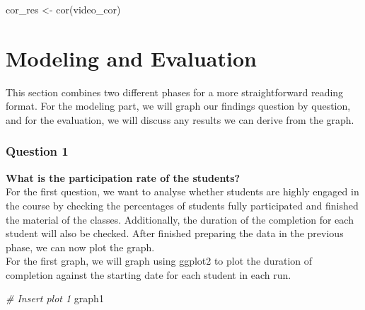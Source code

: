 \documentclass[12pt,]{article}
\newenvironment{Shaded}{\begin{snugshade}}{\end{snugshade}}
\newcommand{\CommentTok}[1]{\textcolor[rgb]{0.56,0.35,0.01}{\textit{#1}}}
\newcommand{\FunctionTok}[1]{\textcolor[rgb]{0.00,0.00,0.00}{#1}}
\newcommand{\NormalTok}[1]{#1}
\newcommand{\OtherTok}[1]{\textcolor[rgb]{0.56,0.35,0.01}{#1}}
\begin{document}
\begin{Shaded}
\begin{Highlighting}[]
\NormalTok{cor\_res }\OtherTok{\textless{}{-}} \FunctionTok{cor}\NormalTok{(video\_cor)}
\end{Highlighting}
\end{Shaded}

\hypertarget{modeling-and-evaluation}{%
\section{Modeling and Evaluation}\label{modeling-and-evaluation}}

This section combines two different phases for a more straightforward
reading format. For the modeling part, we will graph our findings
question by question, and for the evaluation, we will discuss any
results we can derive from the graph.

\hypertarget{question-1-1}{%
\subsubsection{Question 1}\label{question-1-1}}

\textbf{What is the participation rate of the students?}\\
\hfill\break For the first question, we want to analyse whether students
are highly engaged in the course by checking the percentages of students
fully participated and finished the material of the classes.
Additionally, the duration of the completion for each student will also
be checked. After finished preparing the data in the previous phase, we
can now plot the graph.\\
\hfill\break For the first graph, we will graph using ggplot2 to plot
the duration of completion against the starting date for each student in
each run.

\begin{Shaded}
\begin{Highlighting}[]
\CommentTok{\# Insert plot 1}
\NormalTok{graph1}
\end{Highlighting}
\end{Shaded}
\end{document}
